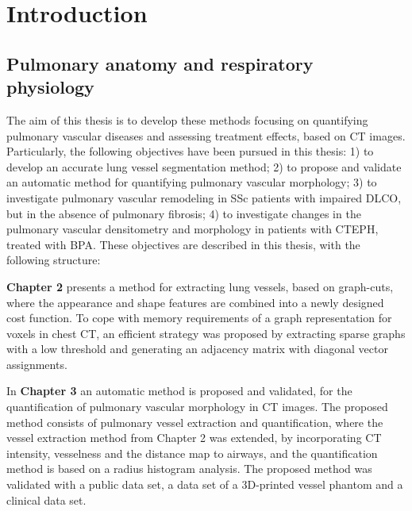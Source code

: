 \graphicspath{{Introduction/figures/}}
\chapter{Introduction}\label{ch:intro}

\ThumbIndexShow

\newcommand{\tb}{\textit{{\textbf{}}}}



\section{Pulmonary anatomy and respiratory physiology}

The aim of this thesis is to develop these methods focusing on quantifying pulmonary vascular diseases and assessing treatment effects, based on CT images. Particularly, the following objectives have been pursued in this thesis: 1) to develop an accurate lung vessel segmentation method; 2) to propose and validate an automatic method for quantifying pulmonary vascular morphology; 3) to investigate pulmonary vascular remodeling in SSc patients with impaired DLCO, but in the absence of pulmonary fibrosis; 4) to investigate changes in the pulmonary vascular densitometry and morphology in patients with CTEPH, treated with BPA. These objectives are described in this thesis, with the following structure:

\textbf{Chapter 2} presents a method for extracting lung vessels, based on graph-cuts, where the appearance and shape features are combined into a newly designed cost function. To cope with memory requirements of a graph representation for voxels in chest CT, an efficient strategy was proposed by extracting sparse graphs with a low threshold and generating an adjacency matrix with diagonal vector assignments. 

In\textbf{ Chapter 3} an automatic method is proposed and validated, for the quantification of pulmonary vascular morphology in CT images. The proposed method consists of pulmonary vessel extraction and quantification, where the vessel extraction method from Chapter 2 was extended, by incorporating CT intensity, vesselness and the distance map to airways, and the quantification method is based on a radius histogram analysis. The proposed method was validated with a public data set, a data set of a 3D-printed vessel phantom and a clinical data set.

